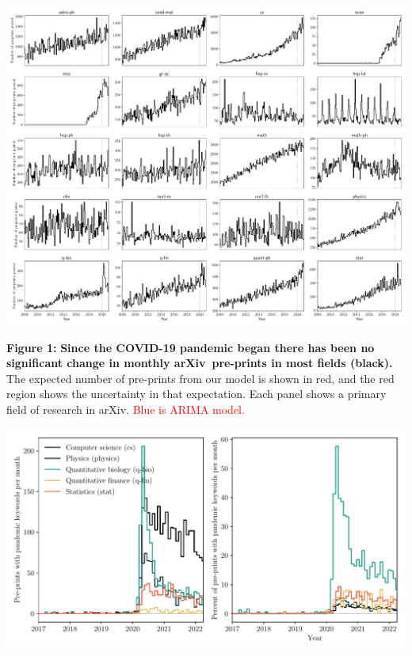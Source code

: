 \documentclass[a4paper,12pt]{article}
\newcommand{\todo}[1]{\textcolor{red}{#1}}
\newcommand{\arxiv}{arXiv}
\begin{document}
\newpage
\begin{center}
\includegraphics[width=0.95\linewidth]{pre-prints-segmented-by-field}
\end{center}

\noindent \textbf{Figure 1:} \textbf{Since the COVID-19 pandemic began there has been no significant change in monthly \arxiv\ pre-prints in most fields (black).} The expected number of pre-prints from our model is shown in red, and the red region shows the uncertainty in that expectation. Each panel shows a primary field of research in \arxiv. \todo{Blue is ARIMA model.}

\newpage

\begin{center}
 \includegraphics[width=\linewidth]{pandemic-related-preprints.pdf}
\end{center}
\end{document}
